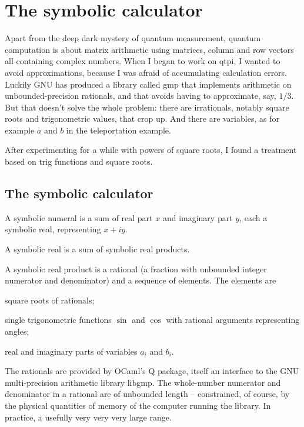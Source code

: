 
\chapter{The symbolic calculator}

Apart from the deep dark mystery of quantum measurement, quantum computation is about matrix arithmetic using matrices, column and row vectors all containing complex numbers. When I began to work on qtpi, I wanted to avoid approximations, because I was afraid of accumulating calculation errors. Luckily GNU has produced a library called gmp that implements arithmetic on unbounded-precision rationals, and that avoids having to approximate, say, $1/3$. But that doesn't solve the whole problem: there are irrationals, notably square roots and trigonometric values, that crop up. And there are variables, as for example $a$ and $b$ in the teleportation example. 

After experimenting for a while with powers of square roots, I found a treatment based on trig functions and square roots.  

\section{The symbolic calculator}

A symbolic numeral is a sum of real part $x$ and imaginary part $y$, each a symbolic real, representing $x+iy$.

A symbolic real is a sum of symbolic real products. 

A symbolic real product is a rational (a fraction with unbounded integer numerator and denominator) and a sequence of elements. The elements are 
\begin{itemize*}
\item square roots of rationals;
\item single trigonometric functions $\sin{}$ and $\cos{}$ with rational arguments representing angles;
\item real and imaginary parts of variables $a_{i}$ and $b_{i}$.
\end{itemize*}

The rationals are provided by OCaml's Q package, itself an interface to the GNU multi-precision arithmetic library libgmp. The whole-number numerator and denominator in a rational are of unbounded length -- constrained, of course, by the physical quantities of memory of the computer running the library.  In practice, a usefully very very very large range.

